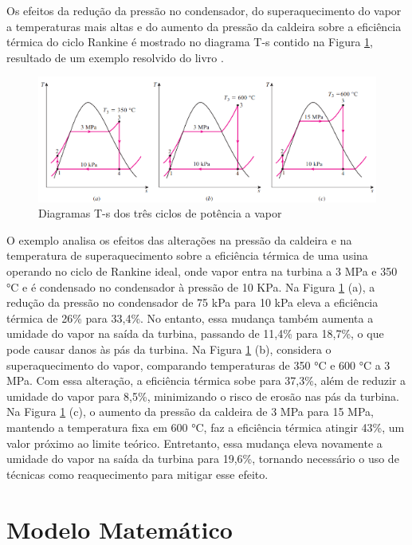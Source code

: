 \documentclass[
	article,			%
	11pt,				%
	oneside,			%
	a4paper,			%
	english,			%
	brazil,				%
	sumario=tradicional
	]{abntex2}
\begin{document}
Os efeitos da redução da pressão no condensador, do superaquecimento do vapor a temperaturas mais altas e do aumento da pressão da caldeira sobre a eficiência térmica do ciclo Rankine é mostrado no diagrama T-s contido na Figura \ref{fig:diagramas-ts-3-ciclos}, resultado de um exemplo resolvido do livro \cite{cengel-2008}.

\begin{figure}[h]
	\centering
	\includegraphics[width=1.0\textwidth]{./images/diagramas-ts-3-ciclos.png}
	\caption{Diagramas T-s dos três ciclos de potência a vapor}
	\label{fig:diagramas-ts-3-ciclos}
\end{figure}

O exemplo analisa os efeitos das alterações na pressão da caldeira e na temperatura de superaquecimento sobre a eficiência térmica de uma usina operando no ciclo de Rankine ideal, onde vapor entra na turbina a 3 MPa e 350 °C e é condensado no condensador à pressão de 10 KPa.
Na Figura \ref{fig:diagramas-ts-3-ciclos} (a), a redução da pressão no condensador de 75 kPa para 10 kPa eleva a eficiência térmica de 26\% para 33,4\%. No entanto, essa mudança também aumenta a umidade do vapor na saída da turbina, passando de 11,4\% para 18,7\%, o que pode causar danos às pás da turbina.
Na Figura \ref{fig:diagramas-ts-3-ciclos} (b), considera o superaquecimento do vapor, comparando temperaturas de 350 °C e 600 °C a 3 MPa. Com essa alteração, a eficiência térmica sobe para 37,3\%, além de reduzir a umidade do vapor para 8,5\%, minimizando o risco de erosão nas pás da turbina.
Na Figura \ref{fig:diagramas-ts-3-ciclos} (c), o aumento da pressão da caldeira de 3 MPa para 15 MPa, mantendo a temperatura fixa em 600 °C, faz a eficiência térmica atingir 43\%, um valor próximo ao limite teórico. Entretanto, essa mudança eleva novamente a umidade do vapor na saída da turbina para 19,6\%, tornando necessário o uso de técnicas como reaquecimento para mitigar esse efeito.

\section{Modelo Matemático}
\end{document}
